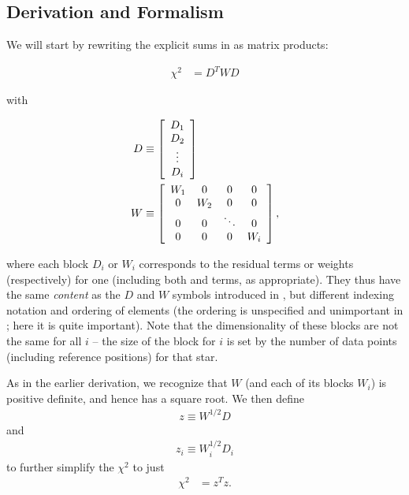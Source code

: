 \subsection{Derivation and Formalism}

We will start by rewriting the explicit sums in  as matrix products:

\begin{align}
    \chi^{2} & = D^T W D
\end{align}

with

\begin{align}
    D & \equiv \left[
        \begin{array}{ c }
            D_1 \\
            D_2 \\
            \vdots \\
            D_i
        \end{array}
    \right] \\
    W & \equiv \left[
        \begin{array}{ c c c c }
               W_1 & 0 & 0 & 0 \\
            0 &    W_2 & 0 & 0 \\
            0 & 0 & \ddots & 0 \\
            0 & 0 & 0 &    W_i
        \end{array}
    \right],
\end{align}

where each block $D_i$ or $W_i$ corresponds to the residual terms or weights (respectively) for one  (including both  and  terms, as appropriate).
They thus have the same \emph{content} as the $D$ and $W$ symbols introduced in , but different indexing notation and ordering of elements (the ordering is unspecified and unimportant in ; here it is quite important).
Note that the dimensionality of these blocks are not the same for all $i$ -- the size of the block for  $i$ is set by the number of data points (including reference positions) for that star.

As in the earlier derivation, we recognize that $W$ (and each of its blocks $W_i$) is positive definite, and hence has a square root.
We then define
\begin{align}
    z \equiv W^{1/2}D
\end{align}
and
\begin{align}
    z_i \equiv W_i^{1/2}D_i
\end{align}
to further simplify the $\chi^2$ to just
\begin{align}
    \chi^{2} & = z^Tz .
\end{align}

